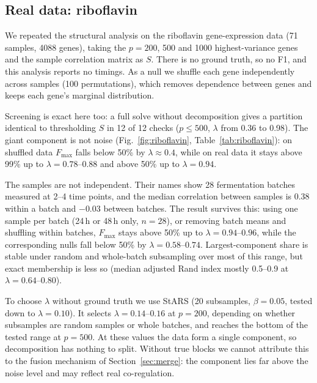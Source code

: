 \documentclass[pdflatex,sn-mathphys-num]{sn-jnl}
\begin{document}
\subsection{Real data: riboflavin}
\label{sec:riboflavin}
We repeated the structural analysis on the riboflavin gene-expression data
\cite{buhlmann2014riboflavin} (71 samples, 4088 genes), taking the $p=200$,
500 and 1000 highest-variance genes and the sample correlation matrix as $S$.
There is no ground truth, so no F1, and this analysis reports no timings. As a
null we shuffle each gene independently across samples (100 permutations),
which removes dependence between genes and keeps each gene's marginal
distribution.

Screening is exact here too: a full solve without decomposition gives a
partition identical to thresholding $S$ in 12 of 12 checks ($p\le500$,
$\lambda$ from 0.36 to 0.98). The giant component is not noise
(Fig.~\ref{fig:riboflavin}, Table~\ref{tab:riboflavin}): on shuffled data
$F_{\max}$ falls below 50\% by $\lambda\approx0.4$, while on real data it stays
above 99\% up to $\lambda=0.78$--$0.88$ and above 50\% up to $\lambda=0.94$.

The samples are not independent. Their names show 28 fermentation batches
measured at 2--4 time points, and the median correlation between samples is
0.38 within a batch and $-0.03$ between batches. The result survives this:
using one sample per batch (24\,h or 48\,h only, $n=28$), or removing batch
means and shuffling within batches, $F_{\max}$ stays above 50\% up to
$\lambda=0.94$--$0.96$, while the corresponding nulls fall below 50\% by
$\lambda=0.58$--$0.74$. Largest-component share is stable under random and
whole-batch subsampling over most of this range, but exact membership is less
so (median adjusted Rand index mostly 0.5--0.9 at $\lambda=0.64$--$0.80$).

To choose $\lambda$ without ground truth we use StARS \cite{liu2010stars}
(20 subsamples, $\beta=0.05$, tested down to $\lambda=0.10$). It selects
$\lambda=0.14$--$0.16$ at $p=200$, depending on whether subsamples are random
samples or whole batches, and reaches the bottom of the tested range at
$p=500$. At these values the data form a single component, so decomposition has
nothing to split. Without true blocks we cannot attribute this to the fusion
mechanism of Section~\ref{sec:merge}: the component lies far above the noise
level and may reflect real co-regulation.
\end{document}
